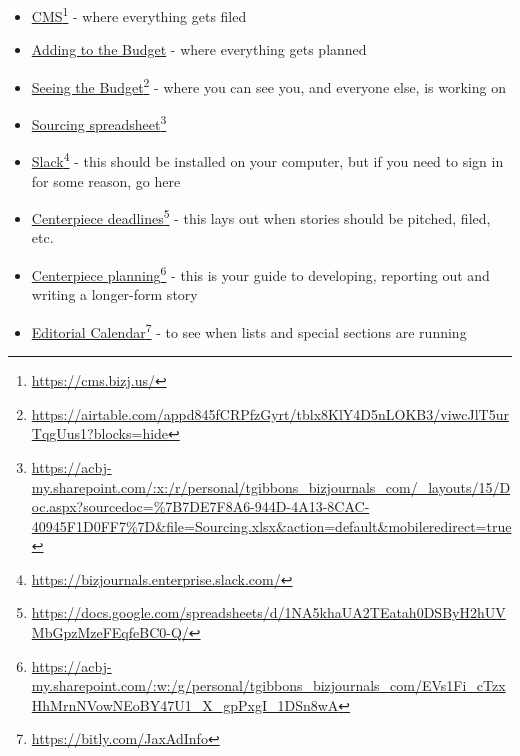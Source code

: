 \documentclass[
  11pt,
  american,
  letterpaperpaper,
  extrafontsizes,onecolumn,openright
  ]{memoir}
\providecommand{\tightlist}{%
  \setlength{\itemsep}{0pt}\setlength{\parskip}{0pt}}
\begin{document}
\begin{itemize}
\tightlist
\item
  \href{https://cms.bizj.us/}{CMS}\footnote{\url{https://cms.bizj.us/}} - where everything gets filed
\item
  \href{https://airtable.com/appd845fCRPfzGyrt/shrab8qrVWmUZD1Ea}{Adding to the Budget} - where everything gets planned
\item
  \href{https://airtable.com/appd845fCRPfzGyrt/tblx8KlY4D5nLOKB3/viwcJlT5urTqgUus1?blocks=hide}{Seeing the Budget}\footnote{\url{https://airtable.com/appd845fCRPfzGyrt/tblx8KlY4D5nLOKB3/viwcJlT5urTqgUus1?blocks=hide}} - where you can see you, and everyone else, is working on
\item
  \href{https://acbj-my.sharepoint.com/:x:/r/personal/tgibbons_bizjournals_com/_layouts/15/Doc.aspx?sourcedoc=\%7B7DE7F8A6-944D-4A13-8CAC-40945F1D0FF7\%7D\&file=Sourcing.xlsx\&action=default\&mobileredirect=true}{Sourcing spreadsheet}\footnote{\url{https://acbj-my.sharepoint.com/:x:/r/personal/tgibbons_bizjournals_com/_layouts/15/Doc.aspx?sourcedoc=\%7B7DE7F8A6-944D-4A13-8CAC-40945F1D0FF7\%7D\&file=Sourcing.xlsx\&action=default\&mobileredirect=true}}
\item
  \href{https://bizjournals.enterprise.slack.com/}{Slack}\footnote{\url{https://bizjournals.enterprise.slack.com/}} - this should be installed on your computer, but if you need to sign in for some reason, go here
\item
  \href{https://docs.google.com/spreadsheets/d/1NA5khaUA2TEatah0DSByH2hUVMbGpzMzeFEqfeBC0-Q/}{Centerpiece deadlines}\footnote{\url{https://docs.google.com/spreadsheets/d/1NA5khaUA2TEatah0DSByH2hUVMbGpzMzeFEqfeBC0-Q/}} - this lays out when stories should be pitched, filed, etc.
\item
  \href{https://acbj-my.sharepoint.com/:w:/g/personal/tgibbons_bizjournals_com/EVs1Fi_cTzxHhMrnNVowNEoBY47U1_X_gpPxgI_1DSn8wA}{Centerpiece planning}\footnote{\url{https://acbj-my.sharepoint.com/:w:/g/personal/tgibbons_bizjournals_com/EVs1Fi_cTzxHhMrnNVowNEoBY47U1_X_gpPxgI_1DSn8wA}} - this is your guide to developing, reporting out and writing a longer-form story
\item
  \href{https://bitly.com/JaxAdInfo}{Editorial Calendar}\footnote{\url{https://bitly.com/JaxAdInfo}} - to see when lists and special sections are running
\end{itemize}


\end{document}
